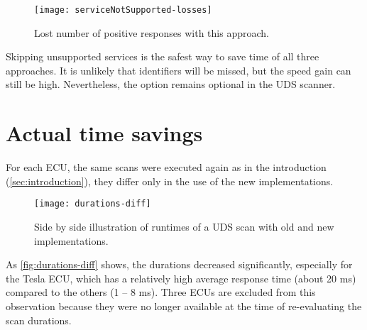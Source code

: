 \begin{figure}[htb]
    \centering
    \texttt{[image: serviceNotSupported-losses]}
    \caption{Lost number of positive responses with this approach.}
    \label{fig:serviceNotSupported-losses}
\end{figure}

Skipping unsupported services is the safest way to save time of all three approaches. It is unlikely that identifiers will be missed, but the speed gain can still be high. Nevertheless, the option remains optional in the UDS scanner.

\section{Actual time savings}

For each ECU, the same scans were executed again as in the introduction (\autoref{sec:introduction}), they differ only in the use of the new implementations.

\begin{figure}[htb]
    \centering
    \texttt{[image: durations-diff]}
    \caption{Side by side illustration of runtimes of a UDS scan with old and new implementations.}
    \label{fig:durations-diff}
\end{figure}

As \autoref{fig:durations-diff} shows, the durations decreased significantly, especially for the Tesla ECU, which has a relatively high average response time (about 20 ms) compared to the others (1 – 8 ms).
Three ECUs are excluded from this observation because they were no longer available at the time of re-evaluating the scan durations.
